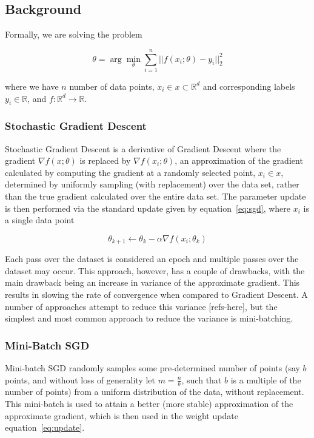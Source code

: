 \documentclass[,conference,compsoc]{IEEEtran}
\begin{document}
\subsection{Background}
Formally, we are solving the problem

\begin{equation}\label{eq:update}
    \theta = \arg \min_{\theta} \sum_{i=1}^n ||f(x_i; \theta) - y_i||_2^2
\end{equation}

where we have $n$ number of data points, $x_i \in x \subset \mathbb{R}^d$ and
corresponding labels $y_i \in \mathbb{R}$, and $f: \mathbb{R}^d \rightarrow
\mathbb{R}$. 

\subsubsection{Stochastic Gradient Descent}
Stochastic Gradient Descent is a derivative of Gradient Descent where the
gradient $\nabla f(x; \theta)$ is replaced by $\nabla f(x_i; \theta)$, an
approximation of the gradient calculated by computing the gradient at a randomly
selected point, $x_i \in x$, determined by uniformly sampling (with replacement)
over the data set, rather than the true gradient calculated over the entire data
set. The parameter update is then performed via the standard
update given by equation~\ref{eq:sgd}, where $x_i$ is a single data point

\begin{equation}\label{eq:sgd}
    \theta_{k+1} \gets \theta_k - \alpha \nabla f(x_i; \theta_k)
\end{equation}

Each pass over the dataset is considered an epoch and multiple passes over the
dataset may occur. This approach, however, has a couple of drawbacks, with the
main drawback being an increase in variance of the approximate gradient. This
results in slowing the rate of convergence when compared to Gradient Descent. A
number of approaches attempt to reduce this variance [refs-here], but the
simplest and most common approach to reduce the variance is mini-batching.

\subsubsection{Mini-Batch SGD}
Mini-batch SGD randomly samples some pre-determined number of points (say $b$
points, and without loss of generality let $m = \frac{n}{b}$, such that $b$ is a
multiple of the number of points) from a uniform distribution of the data,
without replacement. This mini-batch is used to attain a better (more stable)
approximation of the approximate gradient, which is then used in the weight
update equation~\ref{eq:update}.
\end{document}
